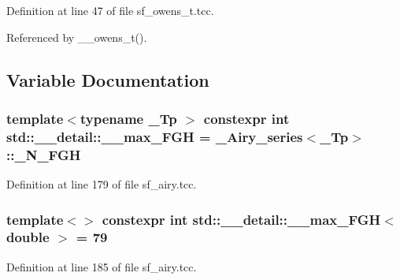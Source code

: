 Definition at line 47 of file sf\+\_\+owens\+\_\+t.\+tcc.



Referenced by \+\_\+\+\_\+owens\+\_\+t().



\subsection{Variable Documentation}
\subsubsection[{\texorpdfstring{\+\_\+\+\_\+max\+\_\+\+F\+GH}{__max_FGH}}]{\setlength{\rightskip}{0pt plus 5cm}template$<$typename \+\_\+\+Tp $>$ constexpr int std\+::\+\_\+\+\_\+detail\+::\+\_\+\+\_\+max\+\_\+\+F\+GH = {\bf \+\_\+\+Airy\+\_\+series}$<$\+\_\+\+Tp$>$\+::\+\_\+\+N\+\_\+\+F\+GH}\hypertarget{namespacestd_1_1____detail_ae3ef7007b55cd83fa162820c809a2995}{}\label{namespacestd_1_1____detail_ae3ef7007b55cd83fa162820c809a2995}


Definition at line 179 of file sf\+\_\+airy.\+tcc.

\subsubsection[{\texorpdfstring{\+\_\+\+\_\+max\+\_\+\+F\+G\+H$<$ double $>$}{__max_FGH< double >}}]{\setlength{\rightskip}{0pt plus 5cm}template$<$$>$ constexpr int {\bf std\+::\+\_\+\+\_\+detail\+::\+\_\+\+\_\+max\+\_\+\+F\+GH}$<$ double $>$ = 79}\hypertarget{namespacestd_1_1____detail_ac945c3d1897eb356e75d379f67367a4b}{}\label{namespacestd_1_1____detail_ac945c3d1897eb356e75d379f67367a4b}


Definition at line 185 of file sf\+\_\+airy.\+tcc.

